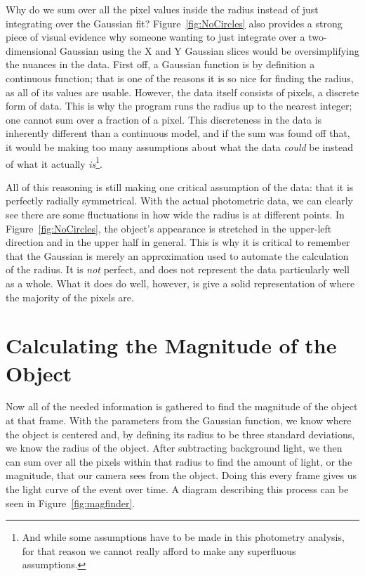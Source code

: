 Why do we sum over all the pixel values inside the radius instead of just integrating over the Gaussian fit? Figure~\ref{fig:NoCircles} also provides a strong piece of visual evidence why someone wanting to just integrate over a two-dimensional Gaussian using the X and Y Gaussian slices would be oversimplifying the nuances in the data. First off, a Gaussian function is by definition a continuous function; that is one of the reasons it is so nice for finding the radius, as all of its values are usable. However, the data itself consists of pixels, a discrete form of data. This is why the program runs the radius up to the nearest integer; one cannot sum over a fraction of a pixel. This discreteness in the data is inherently different than a continuous model, and if the sum was found off that, it would be making too many assumptions about what the data \textit{could} be instead of what it actually \textit{is}\footnote{And while some assumptions have to be made in this photometry analysis, for that reason we cannot really afford to make any superfluous assumptions.}.

All of this reasoning is still making one critical assumption of the data: that it is perfectly radially symmetrical. With the actual photometric data, we can clearly see there are some fluctuations in how wide the radius is at different points. In Figure~\ref{fig:NoCircles}, the object's appearance is stretched in the upper-left direction and in the upper half in general. This is why it is critical to remember that the Gaussian is merely an approximation used to automate the calculation of the radius. It is \textit{not} perfect, and does not represent the data particularly well as a whole. What it does do well, however, is give a solid representation of where the majority of the pixels are.

\section{Calculating the Magnitude of the Object}

Now all of the needed information is gathered to find the magnitude of the object at that frame. With the parameters from the Gaussian function, we know where the object is centered and, by defining its radius to be three standard deviations, we know the radius of the object. After subtracting background light, we then can sum over all the pixels within that radius to find the amount of light, or the magnitude, that our camera sees from the object.  Doing this every frame gives us the light curve of the event over time. A diagram describing this process can be seen in Figure~\ref{fig:magfinder}.

